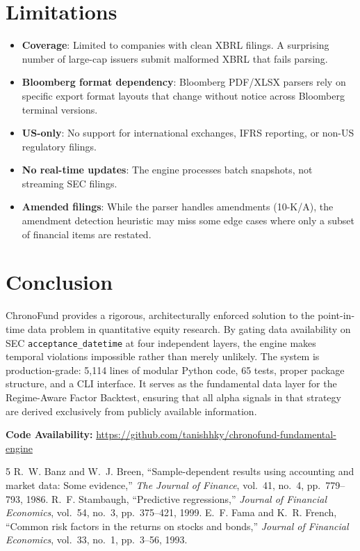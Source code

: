 \documentclass[11pt]{article}
\begin{document}
\section{Limitations}

\begin{itemize}[nosep]
    \item \textbf{Coverage}: Limited to companies with clean XBRL filings. A surprising number of large-cap issuers submit malformed XBRL that fails parsing.
    \item \textbf{Bloomberg format dependency}: Bloomberg PDF/XLSX parsers rely on specific export format layouts that change without notice across Bloomberg terminal versions.
    \item \textbf{US-only}: No support for international exchanges, IFRS reporting, or non-US regulatory filings.
    \item \textbf{No real-time updates}: The engine processes batch snapshots, not streaming SEC filings.
    \item \textbf{Amended filings}: While the parser handles amendments (10-K/A), the amendment detection heuristic may miss some edge cases where only a subset of financial items are restated.
\end{itemize}

\section{Conclusion}

ChronoFund provides a rigorous, architecturally enforced solution to the point-in-time data problem in quantitative equity research. By gating data availability on SEC \texttt{acceptance\_datetime} at four independent layers, the engine makes temporal violations impossible rather than merely unlikely. The system is production-grade: 5,114 lines of modular Python code, 65 tests, proper package structure, and a CLI interface. It serves as the fundamental data layer for the Regime-Aware Factor Backtest, ensuring that all alpha signals in that strategy are derived exclusively from publicly available information.

\medskip
\noindent\textbf{Code Availability:} \url{https://github.com/tanishhky/chronofund-fundamental-engine}

\begin{thebibliography}{5}
 R.~W. Banz and W.~J. Breen, ``Sample-dependent results using accounting and market data: Some evidence,'' \textit{The Journal of Finance}, vol.~41, no.~4, pp.~779--793, 1986.
 R.~F. Stambaugh, ``Predictive regressions,'' \textit{Journal of Financial Economics}, vol.~54, no.~3, pp.~375--421, 1999.
 E.~F. Fama and K.~R. French, ``Common risk factors in the returns on stocks and bonds,'' \textit{Journal of Financial Economics}, vol.~33, no.~1, pp.~3--56, 1993.
\end{thebibliography}
\end{document}
